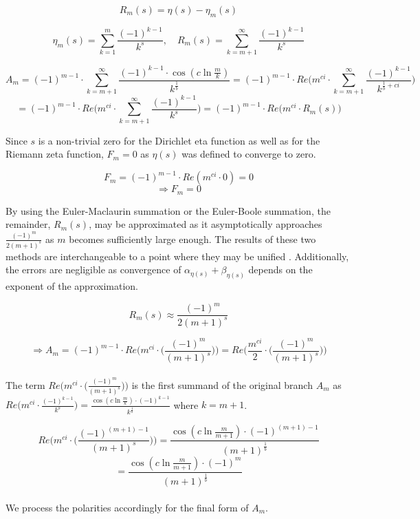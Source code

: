 \documentclass{amsart}
\begin{document}
	\[ R_m(s) = \eta(s) - \eta_m(s) \]
	
	\[ \eta_m(s) = \sum\limits_{k=1}^{m}\frac{(-1)^{k-1}}{k^s} , \quad R_m(s) = \sum\limits_{k=m+1}^{\infty}\frac{(-1)^{k-1}}{k^s} \]
	
	
	
	\[ A_m = (-1)^{m-1} \cdot \sum\limits_{k=m+1}^{\infty} \frac{(-1)^{k-1} {\cdot} \cos(c \ln \frac{m}{k})}{k^{\frac{1}{b}}} = (-1)^{m-1} {\cdot} Re \Big( m^{ci} {\cdot} \sum\limits_{k=m+1}^{\infty}\frac{(-1)^{k-1}}{k^{\frac{1}{b}+ci}}   \Big) \]
	\[ = (-1)^{m-1} {\cdot} Re \Big( m^{ci} {\cdot} \sum\limits_{k=m+1}^{\infty}\frac{(-1)^{k-1}}{k^s}  \Big) = (-1)^{m-1} \cdot Re \Big( m^{ci} {\cdot} R_m(s)  \Big)   \]
	
	Since $s$ is a non-trivial zero for the Dirichlet eta function as well as for the Riemann zeta function, $F_m = 0$ as $\eta(s)$ was defined to converge to zero.
	
	\[ F_m = (-1)^{m-1} \cdot Re(m^{ci} \cdot 0) = 0 \]
	\[ \Rightarrow F_m = 0 \]
	
	By using the Euler-Maclaurin summation or the Euler-Boole summation, the remainder, $R_m(s)$,  may be approximated as it asymptotically approaches $\frac{(-1)^{m}}{2(m+1)^s}$ as $m$ becomes sufficiently large enough. The results of these two methods are interchangeable to a point where they may be unified \cite{yuan_he_unif}. Additionally, the errors are negligible as convergence of $\alpha_{\eta(s)} + \beta_{\eta(s)}$ depends on the exponent of the approximation.
	
	\[ R_m(s) \approx \frac{(-1)^{m}}{2(m+1)^s} \]
	
	\[ \Rightarrow A_m = (-1)^{m-1} \cdot Re\Bigg(m^{ci} {\cdot} \Big(\frac{(-1)^{m}}{(m+1)^s}\Big) \Bigg) = Re\Bigg(\frac{m^{ci}}{2} {\cdot} \Big(\frac{(-1)^{m}}{(m+1)^s}\Big) \Bigg)\]
	\\
	The term $Re\Bigg(m^{ci} {\cdot} \Big(\frac{(-1)^{m}}{(m+1)^s}\Big) \Bigg)$ is the first summand of the original branch $A_m$ as $ Re\Bigg(m^{ci} {\cdot} \frac{(-1)^{k-1}}{k^s} \Bigg) = \frac{\cos(c \ln \frac{m}{k}){\cdot}(-1)^{k-1}}{k^{\frac{1}{b}}} $ where $k = m+1$. 
	
	\[ Re\Bigg(m^{ci} {\cdot} \Big(\frac{(-1)^{(m+1)-1}}{(m+1)^s}\Big) \Bigg) = \frac{\cos(c \ln \frac{m}{m+1}){\cdot}(-1)^{(m+1)-1}}{(m+1)^{\frac{1}{b}}}  \]
	\[= \frac{\cos(c \ln \frac{m}{m+1}){\cdot}(-1)^{m}}{(m+1)^{\frac{1}{b}}} \]
	\\
	We process the polarities accordingly for the final form of $A_m$.
	
\end{document}
